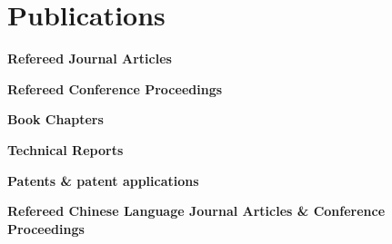 \documentclass[11pt]{article}
\newenvironment{main}
{\begin{adjustwidth}{3em}{}}
{\end{adjustwidth}}
\begin{document}
\section*{Publications}
\begin{main}

\textbf{Refereed Journal Articles}
\begin{refsection}
  \nocite{
    ammar2022identify,
    avetisyan2022design,
    sun2021online,
    yu2019examination,
    feng2018estimation,
    feng2018drivers,
    feng2018effects,
    feng2017can,
    feng2017computer,
    cheng2012driver,
  }
\printbibliography[heading=none]  %
\end{refsection}

\textbf{Refereed Conference Proceedings}
\begin{refsection}
  \nocite{
    munnamgi2022automatic,
    feng2021cyclingsim,
    feng2020naturalistic,
    bao2019examination,
    feng2018vehicle,
    jeong2017computational,
    feng2016spectral,
    chen2016development,
    feng2014computer,
    feng2013computational,
    feng2009board,
    zhang2008a,
    zhang2008b,
    lin2008analysis,
  }
\printbibliography[heading=none]  %
\end{refsection}

\textbf{Book Chapters}
\begin{refsection}
  \nocite{
    owens2019automated,
    pradhan2019training,
  }
\printbibliography[heading=none]  %
\end{refsection}

\textbf{Technical Reports}
\begin{refsection}
  \nocite{
    feng2013speech,
    chen2012survey,
  }
\printbibliography[heading=none]  %
\end{refsection}

\textbf{Patents \& patent applications}
\begin{refsection}
  \nocite{
    delp2020system,
    delp2020passing, 
    Sarvestani2019systems,
  }
\printbibliography[heading=none]  %
\end{refsection}


\textbf{Refereed Chinese Language Journal Articles \& Conference Proceedings}
\begin{refsection}
  \nocite{
    zhang2010real,
    cheng2009driver,
    cheng2008real,
    feng2008rear,
    cheng2007review,
  }
\printbibliography[heading=none]  %
\end{refsection}


\end{main}
\end{document}
